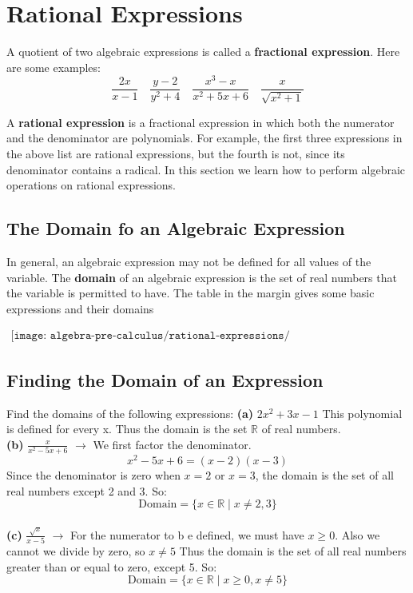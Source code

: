 \section{Rational Expressions}
A quotient of two algebraic expressions is called a \textbf{fractional expression}. Here are
some examples:
$$ \frac{2x}{x-1} \quad \frac{y-2}{y^2+4} \quad \frac{x^3-x}{x^2+5x+6} \quad \frac{x}{\sqrt{x^2+1}}$$

A \textbf{rational expression} is a fractional expression in which both the numerator and the
denominator are polynomials. For example, the first three expressions in the above
list are rational expressions, but the fourth is not, since its denominator contains a
radical. In this section we learn how to perform algebraic operations on rational expressions.

\subsection{The Domain fo an Algebraic Expression}
In general, an algebraic expression may not be defined for all values of the variable.
The \textbf{domain} of an algebraic expression is the set of real numbers that the variable is
permitted to have. The table in the margin gives some basic expressions and their
domains

\begin{align*}
    \texttt{[image: algebra-pre-calculus/rational-expressions/expressions\_domain.png]}
\end{align*}

\subsection{Finding the Domain of an Expression}
Find the domains of the following expressions:
\textbf{(a)} $2x^2+3x-1$
This polynomial is defined for every x. Thus the domain is the set $\mathbb{R}$ of real
numbers. \\
\textbf{(b)} $\displaystyle \frac{x}{x^2-5x+6}$ \quad $\rightarrow$ We first factor the denominator. 
$$ x^2-5x+6 = (x-2)(x-3)$$ Since the denominator is zero when $x=2$ or $x=3$, the domain is the set of all real numbers except 2 and 3. So: $$ \text{Domain} = \{ x \in \mathbb{R} \mid x \neq 2, 3 \}$$
\\ \break 
\textbf{(c)} $\displaystyle \frac{\sqrt{x}}{x-5}$ \quad $\rightarrow$ For the numerator to b e defined, we must have $x\geq0$. Also we cannot we divide by zero, so $x\neq5$
Thus the domain is the set of all real numbers greater than or equal to zero, except 5. So: $$ \text{Domain} = \{ x \in \mathbb{R} \mid x \geq 0, x \neq 5 \}$$

